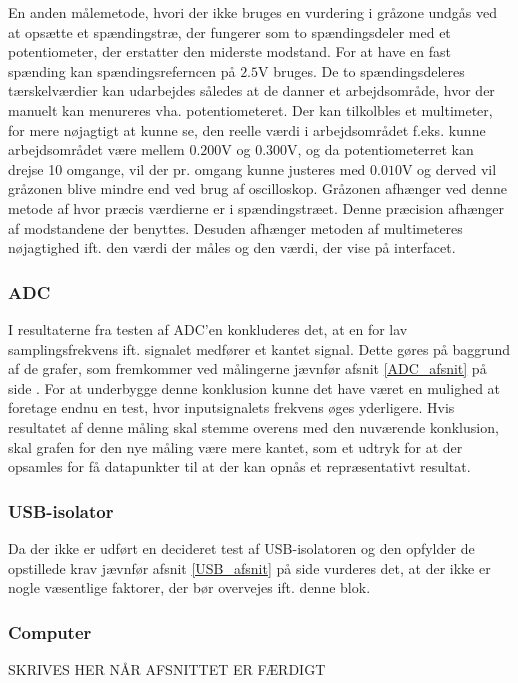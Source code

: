 En anden målemetode, hvori der ikke bruges en vurdering i gråzone undgås ved at opsætte et spændingstræ, der fungerer som to spændingsdeler med et potentiometer, der erstatter den miderste modstand. For at have en fast spænding kan spændingsreferncen på $2.5$V bruges. De to spændingsdeleres tærskelværdier kan udarbejdes således at de danner et arbejdsområde, hvor der manuelt kan menureres vha. potentiometeret. Der kan tilkolbles et multimeter, for mere nøjagtigt at kunne se, den reelle værdi i arbejdsområdet f.eks. kunne arbejdsområdet være mellem $0.200$V og $0.300$V, og da potentiometerret kan drejse 10 omgange, vil der pr. omgang kunne justeres med $0.010$V og derved vil gråzonen blive mindre end ved brug af oscilloskop. Gråzonen afhænger ved denne metode af hvor præcis værdierne er i spændingstræet. Denne præcision afhænger af modstandene der benyttes. Desuden afhænger metoden af multimeteres nøjagtighed ift. den værdi der måles og den værdi, der vise på interfacet.   

\subsubsection{ADC}
I resultaterne fra testen af ADC'en konkluderes det, at en for lav samplingsfrekvens ift. signalet medfører et kantet signal. Dette gøres på baggrund af de grafer, som fremkommer ved målingerne jævnfør afsnit \ref{ADC_afsnit} på side \pageref{ADC_afsnit}. For at underbygge denne konklusion kunne det have været en mulighed at foretage endnu en test, hvor inputsignalets frekvens øges yderligere. Hvis resultatet af denne måling skal stemme overens med den nuværende konklusion, skal grafen for den nye måling være mere kantet, som et udtryk for at der opsamles for få datapunkter til at der kan opnås et repræsentativt resultat.

\subsubsection{USB-isolator}
Da der ikke er udført en decideret test af USB-isolatoren og den opfylder de opstillede krav jævnfør afsnit \ref{USB_afsnit} på side \pageref{USB_afsnit} vurderes det, at der ikke er nogle væsentlige faktorer, der bør overvejes ift. denne blok.

\subsubsection{Computer}
SKRIVES HER NÅR AFSNITTET ER FÆRDIGT

